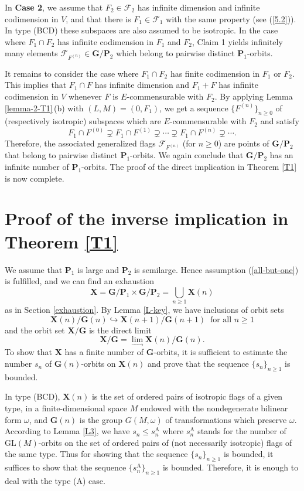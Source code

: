 \documentclass[12pt]{amsart}
\newcommand{\GL}{\mathrm{GL}}
\newcommand{\G}{\mathbf{G}}
\renewcommand{\P}{\mathbf{P}}
\newcommand{\X}{\mathbf{X}}
\newcommand{\Ff}{\mathcal{F}}
\numberwithin{equation}{section}
\theoremstyle{definition}
\begin{document}
In {\bf Case 2}, we assume that $F_2\in\Ff_2$ has infinite dimension and infinite codimension in $V$,
and that there is $F_1\in\Ff_1$ with the same property (see (\ref{5.2})).
In type (BCD) these subspaces are also assumed to be isotropic. In the case where $F_1\cap F_2$ has infinite codimension in $F_1$ and $F_2$, Claim 1 yields infinitely many elements $\Ff_{F^{(n)}}\in\G/\P_2$ which belong to pairwise distinct $\P_1$-orbits.

It remains to consider the case where $F_1\cap F_2$ has finite codimension in $F_1$ or $F_2$. This implies that $F_1\cap F$ has infinite dimension and $F_1+F$ has infinite codimension in $V$ whenever $F$ is $E$-commensurable with $F_2$. 
By applying Lemma \ref{lemma-2-T1}\,{\rm (b)} with $(L,M)=(0,F_1)$, we get a sequence $\{F^{(n)}\}_{n\geq 0}$ of (respectively isotropic) subspaces which are $E$-commensurable with $F_2$ and satisfy
\[F_1\cap F^{(0)}\supsetneq F_1\cap F^{(1)}\supsetneq\cdots\supsetneq F_1\cap F^{(n)}\supsetneq\cdots.\]
Therefore, the associated generalized flags $\Ff_{F^{(n)}}$ (for $n\geq 0$) are points of $\G/\P_2$ that belong to pairwise distinct $\P_1$-orbits. We again conclude that $\G/\P_2$ has an infinite number of $\P_1$-orbits. The proof of the direct implication in Theorem \ref{T1} is now complete.



\section{Proof of the inverse implication in Theorem \ref{T1}}

\label{section-6}

We assume that $\P_1$ is large and $\P_2$ is semilarge. Hence assumption (\ref{all-but-one}) is fulfilled, and we can find an exhaustion
\[\X=\G/\P_1\times \G/\P_2=\bigcup_{n\geq 1} \X(n)\]
as in Section \ref{exhaustion}. By Lemma \ref{L-key}, we have inclusions of orbit sets
\[
\X(n)/\G(n)\hookrightarrow\X(n+1)/\G(n+1)\ \mbox{ for all $n\geq 1$}
\]
and the orbit set $\X/\G$ is the direct limit
\[
\X/\G=\lim_\to \X(n)/\G(n).
\]
To show that $\X$ has a finite number of $\G$-orbits, it is sufficient to estimate the number $s_n$ of $\G(n)$-orbits on $\X(n)$ and prove that the sequence $\{s_n\}_{n\geq 1}$ is bounded.

In type (BCD), $\X(n)$ is the set of ordered pairs of isotropic flags of a given type, in a finite-dimensional space $M$ endowed with the nondegenerate bilinear form $\omega$, and $\G(n)$ is the group $G(M,\omega)$ of transformations which preserve $\omega$. According to Lemma \ref{L3}, we have
$s_n\leq s_n^\mathrm{A}$ where $s_n^\mathrm{A}$ stands for the number of $\GL(M)$-orbits on the set of ordered pairs of (not necessarily isotropic) flags of the same type. Thus for showing that the sequence $\{s_n\}_{n\geq 1}$ is bounded, it suffices to show that the sequence $\{s_n^\mathrm{A}\}_{n\geq 1}$ is bounded. Therefore, it is enough to deal with the type (A) case.
\end{document}
